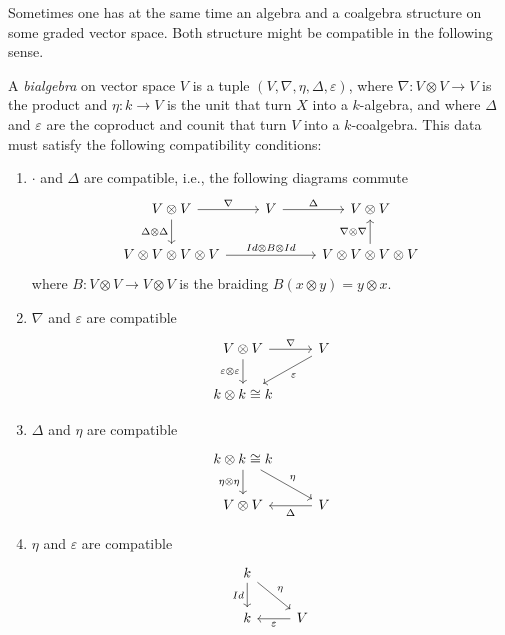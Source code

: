 \documentclass[TFM.tex]{subfiles}
\begin{document}
Sometimes one has at the same time an algebra and a coalgebra structure on some graded vector space. Both structure might be compatible in the following sense.

\begin{defi}
A \emph{bialgebra} on vector space $V$ is a tuple $(V,\nabla,\eta, \Delta,\varepsilon)$, where $\nabla:V\otimes V\to V$ is the product and $\eta:k\to V$ is the unit that turn $X$ into a $k$-algebra, and where $\Delta$ and $\varepsilon$ are the coproduct and counit that turn $V$ into a $k$-coalgebra. This data must satisfy the following compatibility conditions:
\begin{enumerate}
\item $\cdot$ and $\Delta$ are compatible, i.e., the following diagrams commute
\[
\begin{tikzcd}
V\otimes V \arrow[r, "\nabla"] \arrow[d, "\Delta\otimes\Delta"'] & V \arrow[r, "\Delta"] & V\otimes V                                                    \\
V\otimes V\otimes V\otimes V \arrow[rr, "Id\otimes B\otimes Id"] &                       & V\otimes V\otimes V\otimes V \arrow[u, "\nabla\otimes\nabla"]
\end{tikzcd}
\]
where $B:V\otimes V\to V\otimes V$ is the braiding $B(x\otimes y)=y\otimes x$. 

\item $\nabla$ and $\varepsilon$ are compatible
\[
\begin{tikzcd}
V\otimes V \arrow[r, "\nabla"] \arrow[d, "\varepsilon\otimes\varepsilon"'] & V \arrow[ld, "\varepsilon"] \\
k\otimes k\cong k                                                          &                            
\end{tikzcd}
\]
\item $\Delta$ and $\eta$ are compatible
\[
\begin{tikzcd}
k\otimes k\cong k \arrow[d, "\eta\otimes\eta"'] \arrow[rd, "\eta"] &                       \\
V\otimes V                                                         & V \arrow[l, "\Delta"]
\end{tikzcd}
\]
\item $\eta$ and $\varepsilon$ are compatible
\[
\begin{tikzcd}
k \arrow[rd, "\eta"] \arrow[d, "Id"'] &                            \\
k                                     & V \arrow[l, "\varepsilon"]
\end{tikzcd}
\]
\end{enumerate}

\end{defi}
\end{document}
